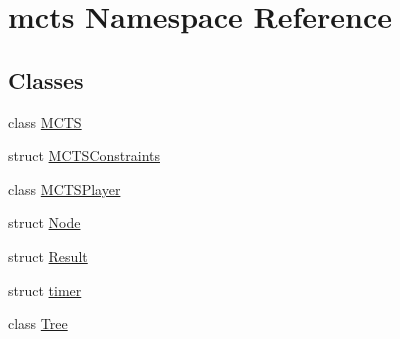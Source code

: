 \hypertarget{namespacemcts}{}\section{mcts Namespace Reference}
\label{namespacemcts}
\subsection*{Classes}
\begin{DoxyCompactItemize}
\item 
class \hyperlink{classmcts_1_1_m_c_t_s}{M\+C\+TS}
\item 
struct \hyperlink{structmcts_1_1_m_c_t_s_constraints}{M\+C\+T\+S\+Constraints}
\item 
class \hyperlink{classmcts_1_1_m_c_t_s_player}{M\+C\+T\+S\+Player}
\item 
struct \hyperlink{structmcts_1_1_node}{Node}
\item 
struct \hyperlink{structmcts_1_1_result}{Result}
\item 
struct \hyperlink{structmcts_1_1timer}{timer}
\item 
class \hyperlink{classmcts_1_1_tree}{Tree}
\end{DoxyCompactItemize}
